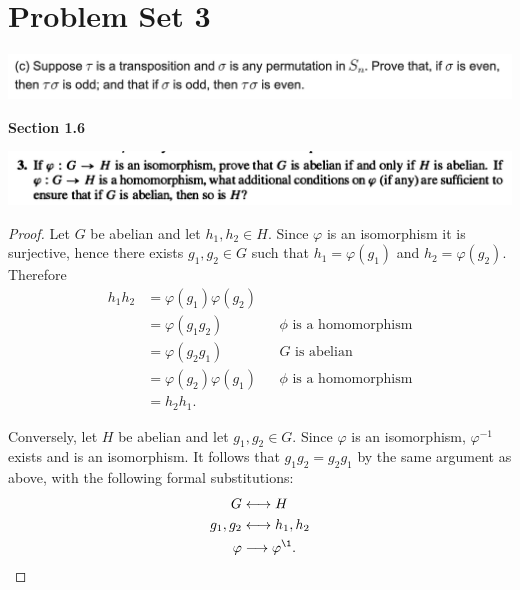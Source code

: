 
\section*{Problem  Set 3}


\begin{mdframed}
\includegraphics[width=400pt]{img/algebra--nf--2-179c.png}
\end{mdframed}





\newpage
{\bf Section 1.6}\\

\begin{mdframed}
\includegraphics[width=400pt]{img/abstract-algebra--nf--3-4cd9.png}
\end{mdframed}

\begin{proof}
  Let $G$ be abelian and let $h_1, h_2 \in H$. Since $\varphi$ is an isomorphism it is surjective, hence
  there exists $g_1, g_2 \in G$ such that $h_1 = \varphi(g_1)$ and $h_2 = \varphi(g_2)$. Therefore
  \begin{align*}
    h_1h_2 &= \varphi(g_1)\varphi(g_2)\\
           &= \varphi(g_1g_2)       &&\text{$\phi$ is a homomorphism}\\
           &= \varphi(g_2g_1)       &&\text{$G$ is abelian }\\
           &= \varphi(g_2)\varphi(g_1)    &&\text{$\phi$ is a homomorphism}\\
           &= h_2h_1.
  \end{align*}

  Conversely, let $H$ be abelian and let $g_1, g_2 \in G$. Since $\varphi$ is an isomorphism,
  $\varphi^{-1}$ exists and is an isomorphism. It follows that $g_1g_2 = g_2g_1$ by the same argument as
  above, with the following formal substitutions:
  \begin{align*}
    G &\longleftrightarrow H \\
    g_1, g_2 &\longleftrightarrow h_1, h_2 \\
    \varphi &\longrightarrow \varphi^\1.
  \end{align*}
\end{proof}

